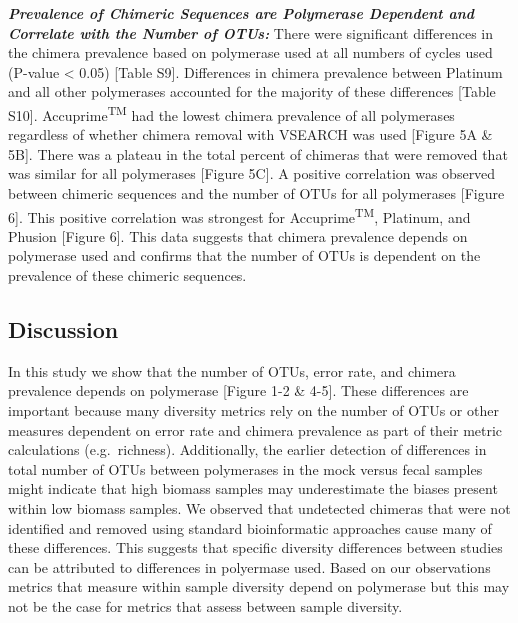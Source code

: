 \documentclass[12pt,]{article}
\begin{document}
\textbf{\emph{Prevalence of Chimeric Sequences are Polymerase Dependent
and Correlate with the Number of OTUs:}} There were significant
differences in the chimera prevalence based on polymerase used at all
numbers of cycles used (P-value \textless{} 0.05) {[}Table S9{]}.
Differences in chimera prevalence between Platinum and all other
polymerases accounted for the majority of these differences {[}Table
S10{]}. Accuprime\textsuperscript{TM} had the lowest chimera prevalence
of all polymerases regardless of whether chimera removal with VSEARCH
was used {[}Figure 5A \& 5B{]}. There was a plateau in the total percent
of chimeras that were removed that was similar for all polymerases
{[}Figure 5C{]}. A positive correlation was observed between chimeric
sequences and the number of OTUs for all polymerases {[}Figure 6{]}.
This positive correlation was strongest for
Accuprime\textsuperscript{TM}, Platinum, and Phusion {[}Figure 6{]}.
This data suggests that chimera prevalence depends on polymerase used
and confirms that the number of OTUs is dependent on the prevalence of
these chimeric sequences.

\newpage

\subsection{Discussion}\label{discussion}

In this study we show that the number of OTUs, error rate, and chimera
prevalence depends on polymerase {[}Figure 1-2 \& 4-5{]}. These
differences are important because many diversity metrics rely on the
number of OTUs or other measures dependent on error rate and chimera
prevalence as part of their metric calculations (e.g.~richness).
Additionally, the earlier detection of differences in total number of
OTUs between polymerases in the mock versus fecal samples might indicate
that high biomass samples may underestimate the biases present within
low biomass samples. We observed that undetected chimeras that were not
identified and removed using standard bioinformatic approaches cause
many of these differences. This suggests that specific diversity
differences between studies can be attributed to differences in
polyermase used. Based on our observations metrics that measure within
sample diversity depend on polymerase but this may not be the case for
metrics that assess between sample diversity.
\end{document}
